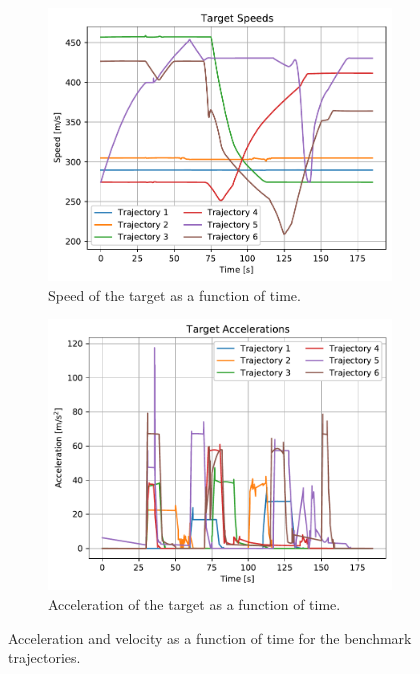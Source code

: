 \documentclass[english, 12pt, a4paper, elec, utf8, a-1b, online]{aaltothesis}
\numberwithin{equation}{section}
\begin{document}
\begin{figure}
    \centering
    \begin{subfigure}{0.8\textwidth}
        \includegraphics[width=\linewidth]{figures/benchmark/velocities.pdf}
        \caption{Speed of the target as a function of time.}
        \label{fig:benchmark_velocities}
    \end{subfigure}
    \hfill
    \begin{subfigure}{0.8\textwidth}
        \includegraphics[width=\linewidth]{figures/benchmark/accelerations.pdf}
        \caption{Acceleration of the target as a function of time.}
        \label{fig:benchmark_acceleration}
    \end{subfigure}
    \label{fig:benchmark_vel_acc}
    \caption{Acceleration and velocity as a function of time for the benchmark trajectories. }
\end{figure}
\end{document}
